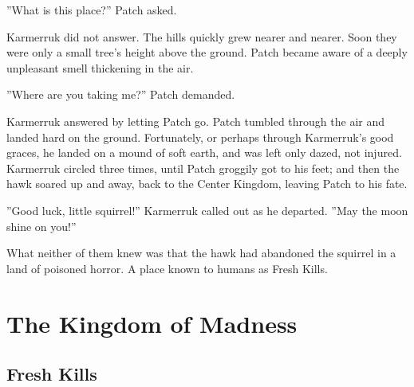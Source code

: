 \documentclass[12pt]{book}
\begin{document}
''What is this place?'' Patch asked.\par
Karmerruk did not answer. The hills quickly grew nearer and nearer. Soon they were only a small tree's height above the ground. Patch became aware of a deeply unpleasant smell thickening in the air.\par
 ''Where are you taking me?'' Patch demanded.\par
 Karmerruk answered by letting Patch go. Patch tumbled through the air and landed hard on the ground. Fortunately, or perhaps through Karmerruk's good graces, he landed on a mound of soft earth, and was left only dazed, not injured. Karmerruk circled three times, until Patch groggily got to his feet; and then the hawk soared up and away, back to the Center Kingdom, leaving Patch to his fate.\par
 ''Good luck, little squirrel!'' Karmerruk called out as he departed. ''May the moon shine on you!''\par
What neither of them knew was that the hawk had abandoned the squirrel in a land of poisoned horror. A place known to humans as Fresh Kills.\par

\chapter{The Kingdom of Madness}


\section{Fresh Kills}
\end{document}
